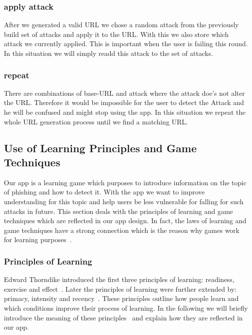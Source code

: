 \subsubsection{apply attack}
After we generated a valid URL we chose a random attack from the previously build set of attacks and apply it to the URL. With this we also store which attack we currently applied. This is important when the user is failing this round. In this situation we will simply readd this attack to the set of attacks.
\subsubsection{repeat}
There are combinations of base-URL and attack where the attack doe's not alter the URL.
Therefore it would be impossible for the user to detect the Attack and he will be confused and might stop using the app.
In this situation we repeat the whole URL generation process until we find a matching URL.


\subsection{Use of Learning Principles and Game Techniques}
Our app is a learning game which purposes to introduce information on the topic of phishing and how to detect it.
With the app we want to improve understanding for this topic and help users be less vulnerable for falling for such attacks in future.
This section deals with the principles of learning and game techniques which are reflected in our app design.
In fact, the laws of learning and game techniques have a strong connection which is the reason why games work for learning purposes~\cite{murphy2011games}.
\subsubsection{Principles of Learning}
\label{s:learning_principles}
Edward Thorndike introduced the first three principles of learning: readiness, exercise and effect~\cite{thorndike1932fundamentals, murphy2011games, handbook2008us}. 
Later the principles of learning were further extended by: primacy, intensity and recency~\cite{murphy2011games, handbook2008us}.
These principles outline how people learn and which conditions improve their process of learning.
In the following we will briefly introduce the meaning of these principles~\cite{murphy2011games} and explain how they are reflected in our app.

